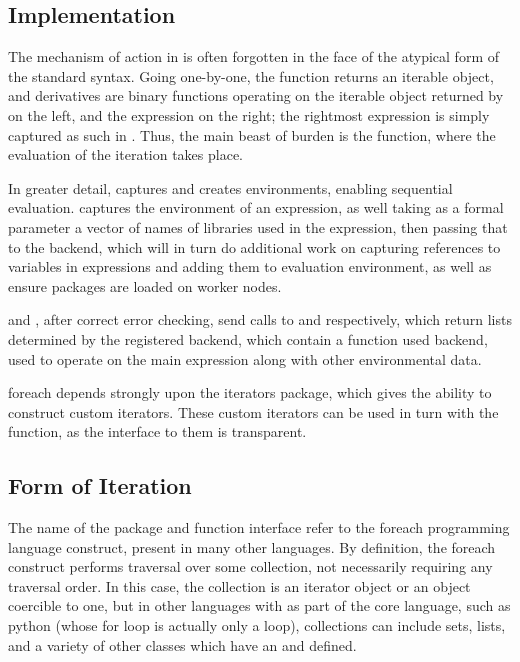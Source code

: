 \subsection{Implementation}\label{sec:implementation}

The mechanism of action in  is often forgotten in the face of the
atypical form of the standard syntax. Going one-by-one, the
 function returns an iterable
object,  and derivatives are binary functions operating
on the iterable object returned by
 on the left, and the
expression on the right; the rightmost expression is simply captured as
such in . Thus, the main beast of burden is the
 function, where the evaluation of the iteration takes
place.

In greater detail,  captures and creates environments,
enabling sequential evaluation.  captures the
environment of an expression, as well taking as a formal parameter a
vector of names of libraries used in the expression, then passing that
to the backend, which will in turn do additional work on capturing
references to variables in expressions and adding them to evaluation
environment, as well as ensure packages are loaded on worker nodes.

 and , after correct error checking,
send calls to  and
 respectively, which return
lists determined by the registered backend, which contain a function
used backend, used to operate on the main expression along with other
environmental data.

foreach depends strongly upon the iterators package, which gives the
ability to construct custom iterators. These custom iterators can be
used in turn with the 
function, as the interface to them is transparent.

\subsection{Form of Iteration}\label{sec:form-iter}

The name of the package and function interface refer to the
foreach programming language construct, present in many other
languages. By definition, the foreach construct performs
traversal over some collection, not necessarily requiring any traversal
order. In this case, the collection is an iterator object or an object
coercible to one, but in other languages with  as part of the
core language, such as python (whose for loop is actually only a 
loop), collections can include sets, lists, and a variety of other
classes which have an  and
 defined\cite{python2020iter}.

